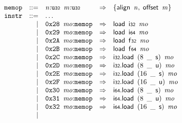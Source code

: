 $$
\begin{array}{@{}l@{}rrlll@{}l@{}}
& {\mathtt{memop}} &::=& {\mathit{n}}{:}{\mathtt{u{\scriptstyle32}}}~\,{\mathit{m}}{:}{\mathtt{u{\scriptstyle32}}} &\Rightarrow& \{ \begin{array}[t]{@{}l@{}}
\mathsf{align}~\,{\mathit{n}},\; \mathsf{offset}~\,{\mathit{m}} \}\end{array} \\
& {\mathtt{instr}} &::=& \dots \\ &&|&
\mathtt{0x28}~\,{\mathit{mo}}{:}{\mathtt{memop}} &\Rightarrow& \mathsf{load}~\,\mathsf{i{\scriptstyle32}}~\,{\mathit{mo}} \\ &&|&
\mathtt{0x29}~\,{\mathit{mo}}{:}{\mathtt{memop}} &\Rightarrow& \mathsf{load}~\,\mathsf{i{\scriptstyle64}}~\,{\mathit{mo}} \\ &&|&
\mathtt{0x2A}~\,{\mathit{mo}}{:}{\mathtt{memop}} &\Rightarrow& \mathsf{load}~\,\mathsf{f{\scriptstyle32}}~\,{\mathit{mo}} \\ &&|&
\mathtt{0x2B}~\,{\mathit{mo}}{:}{\mathtt{memop}} &\Rightarrow& \mathsf{load}~\,\mathsf{f{\scriptstyle64}}~\,{\mathit{mo}} \\ &&|&
\mathtt{0x2C}~\,{\mathit{mo}}{:}{\mathtt{memop}} &\Rightarrow& \mathsf{i{\scriptstyle32}}.\mathsf{load}~\,(8~\,\mathsf{\_}~\,\mathsf{s})~\,{\mathit{mo}} \\ &&|&
\mathtt{0x2D}~\,{\mathit{mo}}{:}{\mathtt{memop}} &\Rightarrow& \mathsf{i{\scriptstyle32}}.\mathsf{load}~\,(8~\,\mathsf{\_}~\,\mathsf{u})~\,{\mathit{mo}} \\ &&|&
\mathtt{0x2E}~\,{\mathit{mo}}{:}{\mathtt{memop}} &\Rightarrow& \mathsf{i{\scriptstyle32}}.\mathsf{load}~\,(16~\,\mathsf{\_}~\,\mathsf{s})~\,{\mathit{mo}} \\ &&|&
\mathtt{0x2F}~\,{\mathit{mo}}{:}{\mathtt{memop}} &\Rightarrow& \mathsf{i{\scriptstyle32}}.\mathsf{load}~\,(16~\,\mathsf{\_}~\,\mathsf{u})~\,{\mathit{mo}} \\ &&|&
\mathtt{0x30}~\,{\mathit{mo}}{:}{\mathtt{memop}} &\Rightarrow& \mathsf{i{\scriptstyle64}}.\mathsf{load}~\,(8~\,\mathsf{\_}~\,\mathsf{s})~\,{\mathit{mo}} \\ &&|&
\mathtt{0x31}~\,{\mathit{mo}}{:}{\mathtt{memop}} &\Rightarrow& \mathsf{i{\scriptstyle64}}.\mathsf{load}~\,(8~\,\mathsf{\_}~\,\mathsf{u})~\,{\mathit{mo}} \\ &&|&
\mathtt{0x32}~\,{\mathit{mo}}{:}{\mathtt{memop}} &\Rightarrow& \mathsf{i{\scriptstyle64}}.\mathsf{load}~\,(16~\,\mathsf{\_}~\,\mathsf{s})~\,{\mathit{mo}} \\ &&|&

\end{array}$$
